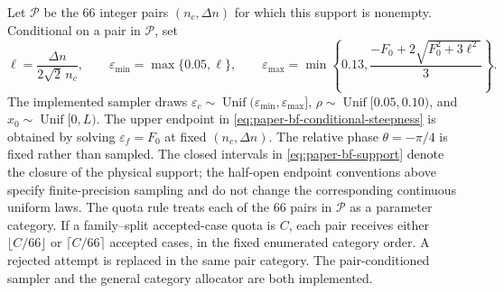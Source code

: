 Let $\mathcal P$ be the 66 integer pairs $(n_c,\Delta n)$ for which this
support is nonempty.  Conditional on a pair in $\mathcal P$, set
\begin{equation}
  \ell=\frac{\Delta n}{2\sqrt2\,n_c},\qquad
  \varepsilon_{\min}=\max\{0.05,\ell\},\qquad
  \varepsilon_{\max}
  =\min\left\{0.13,
    \frac{-F_0+2\sqrt{F_0^2+3\ell^2}}{3}\right\}.
  \label{eq:paper-bf-conditional-steepness}
\end{equation}
The implemented sampler draws
$\varepsilon_c\sim\operatorname{Unif}
(\varepsilon_{\min},\varepsilon_{\max}]$,
$\rho\sim\operatorname{Unif}[0.05,0.10)$, and
$x_0\sim\operatorname{Unif}[0,L)$.  The upper endpoint in
\cref{eq:paper-bf-conditional-steepness} is obtained by solving
$\varepsilon_f=F_0$ at fixed $(n_c,\Delta n)$.  The relative phase
$\theta=-\pi/4$ is fixed rather than sampled.  The closed intervals in
\cref{eq:paper-bf-support} denote the closure of the physical support; the
half-open endpoint conventions above specify finite-precision sampling and do
not change the corresponding continuous uniform laws.
The quota rule treats each of the 66 pairs in
$\mathcal P$ as a parameter category.  If a family--split accepted-case quota is $C$, each
pair receives either $\lfloor C/66\rfloor$ or $\lceil C/66\rceil$ accepted
cases, in the fixed enumerated category order.  A rejected attempt is replaced in
the same pair category.  The pair-conditioned sampler and the general category
allocator are both implemented.

